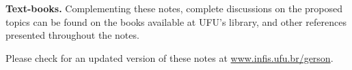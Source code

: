\textbf{Text-books.} Complementing these notes, complete discussions on the proposed topics can be found on the books available at UFU's library\cite{CScherer2010Metodos, NFranco2006Calculo, Arenales2008Calculo, JCButcher2008NumericalODE, thijssen2007computational, pang2006introduction}, and other references presented throughout the notes.

\vfill
Please check for an updated version of these notes at \url{www.infis.ufu.br/gerson}.